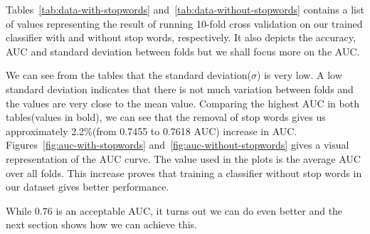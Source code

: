 Tables~\ref{tab:data-with-stopwords} and~\ref{tab:data-without-stopwords} contains a list of values
representing the result of running 10-fold cross validation on our trained classifier with and
without stop words, respectively. It also depicts the accuracy, AUC and standard deviation between
folds but we shall focus more on the AUC.

We can see from the tables that the standard deviation($\sigma$) is very low. A low standard
deviation indicates that there is not much variation between folds and the values are very close to
the mean value. Comparing the highest AUC in both tables(values in bold), we can see that the
removal of stop words gives us approximately 2.2\%(from 0.7455 to 0.7618 AUC) increase in AUC\@.
Figures~\ref{fig:auc-with-stopwords} and~\ref{fig:auc-without-stopwords} gives a visual
representation of the AUC curve. The value used in the plots is the average AUC over all folds.
This increase proves that training a classifier without stop words in our dataset gives better
performance.

While 0.76 is an acceptable AUC, it turns out we can do even better and the next section shows how
we can achieve this.

